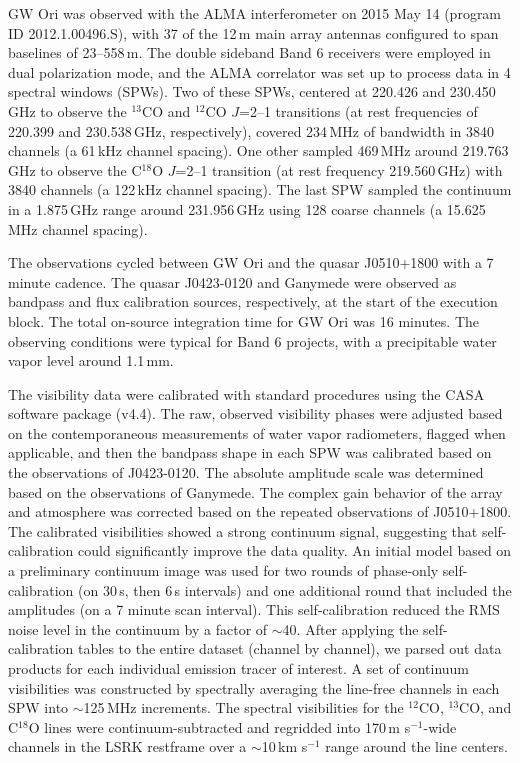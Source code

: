 \documentclass[twocolumn]{aastex61}
\begin{document}
GW Ori was observed with the ALMA interferometer on 2015 May 14 (program ID 2012.1.00496.S), with 37 of the 12\,m main array antennas configured to span baselines of 23--558\,m.  The double sideband Band 6 receivers were employed in dual polarization mode, and the ALMA correlator was set up to process data in 4 spectral windows (SPWs).  Two of these SPWs, centered at 220.426 and 230.450\,GHz to observe the $^{13}$CO and $^{12}$CO $J$=2--1 transitions (at rest frequencies of 220.399 and 230.538\,GHz, respectively), covered 234\,MHz of bandwidth in 3840 channels (a 61\,kHz channel spacing).  One other sampled 469\,MHz around 219.763\,GHz to observe the C$^{18}$O $J$=2--1 transition (at rest frequency 219.560\,GHz) with 3840 channels (a 122\,kHz channel spacing).  The last SPW sampled the continuum in a 1.875\,GHz range around 231.956\,GHz using 128 coarse channels (a 15.625\,MHz channel spacing).

The observations cycled between GW Ori and the quasar J0510+1800 with a 7 minute cadence.  The quasar J0423-0120 and Ganymede were observed as bandpass and flux calibration sources, respectively, at the start of the execution block.  The total on-source integration time for GW Ori was 16 minutes.  The observing conditions were typical for Band 6 projects, with a precipitable water vapor level around 1.1\,mm.

The visibility data were calibrated with standard procedures using the {\sc CASA} software package (v4.4).  The raw, observed visibility phases were adjusted based on the contemporaneous measurements of water vapor radiometers, flagged when applicable, and then the bandpass shape in each SPW was calibrated based on the observations of J0423-0120.  The absolute amplitude scale was determined based on the observations of Ganymede.  The complex gain behavior of the array and atmosphere was corrected based on the repeated observations of J0510+1800.  The calibrated visibilities showed a strong continuum signal, suggesting that self-calibration could significantly improve the data quality.  An initial model based on a preliminary continuum image was used for two rounds of phase-only self-calibration (on 30\,s, then 6\,s intervals) and one additional round that included the amplitudes (on a 7 minute scan interval).  This self-calibration reduced the RMS noise level in the continuum by a factor of $\sim$40.  After applying the self-calibration tables to the entire dataset (channel by channel),  we parsed out data products for each individual emission tracer of interest.  A set of continuum visibilities was constructed by spectrally averaging the line-free channels in each SPW into $\sim$125\,MHz increments.  The spectral visibilities for the $^{12}$CO, $^{13}$CO, and C$^{18}$O lines were continuum-subtracted and regridded into 170\,m s$^{-1}$-wide channels in the LSRK restframe over a $\sim$10\,km s$^{-1}$ range around the line centers.
\end{document}
